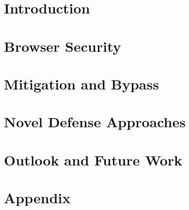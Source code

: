 \documentclass[abstracton,a4paper,11pt,titlepage,openright]{scrreprt}
\begin{document}
\cleardoublepage
\tableofcontents
\cleardoublepage
{}
\pagestyle{plain}

\chapter{Introduction}
\label{ch:1:introduction}



\chapter{Browser Security}
\label{ch:2:browser-and-web-security}


%

\chapter{Mitigation and Bypass}
\label{ch:3:mitigation-and-bypass}




\chapter{Novel Defense Approaches}
\label{ch:4:novel-defense-approaches}



\chapter{Outlook and Future Work}
\label{ch:7:outlook-and-future-work}


\chapter{Appendix}
\label{ch:5:appendix}




\cleardoublepage


\newpage

%


\cleardoublepage
{}

\end{document}

